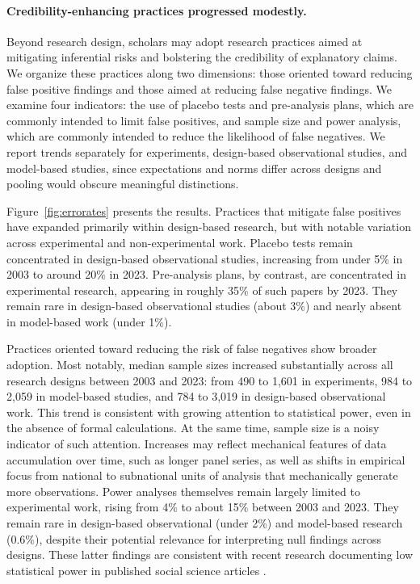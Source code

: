 \documentclass[12pt]{article}
\begin{document}
\paragraph*{Credibility-enhancing practices progressed modestly.}\label{errorates}

Beyond research design, scholars may adopt research practices aimed at mitigating inferential risks and bolstering the credibility of explanatory claims. We organize these practices along two dimensions: those oriented toward reducing false positive findings and those aimed at reducing false negative findings. We examine four indicators: the use of placebo tests and pre-analysis plans, which are commonly intended to limit false positives, and sample size and power analysis, which are commonly intended to reduce the likelihood of false negatives. We report trends separately for experiments, design-based observational studies, and model-based studies, since expectations and norms differ across designs and pooling would obscure meaningful distinctions.

Figure~\ref{fig:errorates} presents the results. Practices that mitigate false positives have expanded primarily within design-based research, but with notable variation across experimental and non-experimental work. Placebo tests remain concentrated in design-based observational studies, increasing from under 5\% in 2003 to around 20\% in 2023. Pre-analysis plans, by contrast, are concentrated in experimental research, appearing in roughly 35\% of such papers by 2023. They remain rare in design-based observational studies (about 3\%) and nearly absent in model-based work (under 1\%).

Practices oriented toward reducing the risk of false negatives show broader adoption. Most notably, median sample sizes increased substantially across all research designs between 2003 and 2023: from 490 to 1,601 in experiments, 984 to 2,059 in model-based studies, and 784 to 3,019 in design-based observational work. This trend is consistent with growing attention to statistical power, even in the absence of formal calculations. At the same time, sample size is a noisy indicator of such attention. Increases may reflect mechanical features of data accumulation over time, such as longer panel series, as well as shifts in empirical focus from national to subnational units of analysis that mechanically generate more observations.
 Power analyses themselves remain largely limited to experimental work, rising from 4\% to about 15\% between 2003 and 2023. They remain rare in design-based observational (under 2\%) and model-based research (0.6\%), despite their potential relevance for interpreting null findings across designs. These latter findings are consistent with recent research documenting low statistical power in published social science articles \citep{arelBundock2026underpowered}.
\end{document}
